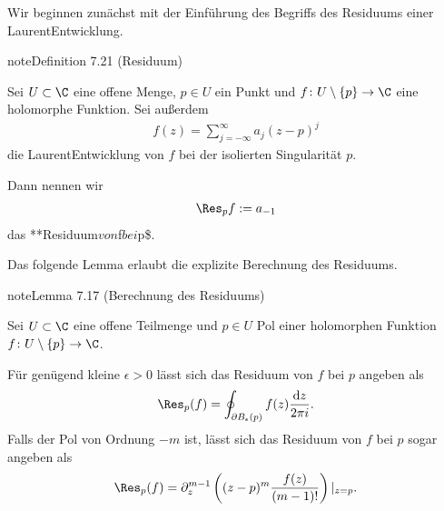 \documentclass[letterpaper,10pt,german]{jupyterBook}
\begin{document}
\sphinxAtStartPar
Wir beginnen zunächst mit der Einführung des Begriffs des Residuums einer Laurent\sphinxhyphen{}Entwicklung.
\label{complexanalysis/residuensatz:definition-12}
\begin{sphinxadmonition}{note}{Definition 7.21 (Residuum)}



\sphinxAtStartPar
Sei \(U \subset \C\) eine offene Menge, \(p \in U\) ein Punkt und \(f \colon U \setminus \{p\} \rightarrow \C\) eine holomorphe Funktion.
Sei außerdem
\begin{equation*}
\begin{split}f(z) = \sum_{j=-\infty}^\infty a_j (z-p)^j\end{split}
\end{equation*}
\sphinxAtStartPar
die Laurent\sphinxhyphen{}Entwicklung von \(f\) bei der isolierten Singularität \(p\).

\sphinxAtStartPar
Dann nennen wir
\begin{equation*}
\begin{split}\Res_p f := a_{-1}\end{split}
\end{equation*}
\sphinxAtStartPar
das **Residuum\( von \)f\( bei \)p\$.
\end{sphinxadmonition}

\sphinxAtStartPar
Das folgende Lemma erlaubt die explizite Berechnung des Residuums.
\label{complexanalysis/residuensatz:lemma-13}
\begin{sphinxadmonition}{note}{Lemma 7.17 (Berechnung des Residuums)}



\sphinxAtStartPar
Sei \(U \subset \C\) eine offene Teilmenge und \(p \in U\) Pol einer holomorphen Funktion \(f \colon U \setminus \{p\} \rightarrow \C\).

\sphinxAtStartPar
Für genügend kleine \(\epsilon > 0\) lässt sich das Residuum von \(f\) bei \(p\) angeben als
\begin{equation*}
\begin{split}\Res_{p}(f) = \oint_{\partial B_\epsilon(p)} f(z) \frac{\mathrm{d}z}{2\pi i}.\end{split}
\end{equation*}
\sphinxAtStartPar
Falls der Pol von Ordnung \(-m\) ist, lässt sich das Residuum von \(f\) bei \(p\) sogar angeben als
\begin{equation*}
\begin{split}\Res_{p}(f) = \partial_z^{m-1}\left( (z-p)^m \frac{f(z)}{(m-1)!}\right)|_{z=p}.\end{split}
\end{equation*}\end{sphinxadmonition}
\end{document}
